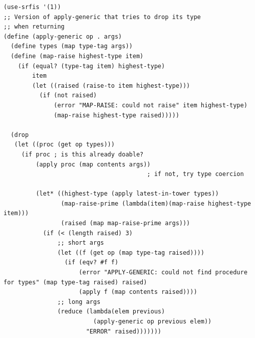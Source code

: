 \documentclass[final,fleqn,titlepage,twoside]{article}
\begin{document}
\begin{verbatim}
(use-srfis '(1))
;; Version of apply-generic that tries to drop its type
;; when returning
(define (apply-generic op . args)
  (define types (map type-tag args))
  (define (map-raise highest-type item)
    (if (equal? (type-tag item) highest-type)
        item
        (let ((raised (raise-to item highest-type)))
          (if (not raised)
              (error "MAP-RAISE: could not raise" item highest-type)
              (map-raise highest-type raised)))))
  
  (drop
   (let ((proc (get op types)))
     (if proc ; is this already doable?
         (apply proc (map contents args))
                                        ; if not, try type coercion
         
         (let* ((highest-type (apply latest-in-tower types))
                (map-raise-prime (lambda(item)(map-raise highest-type item)))
                (raised (map map-raise-prime args)))
           (if (< (length raised) 3)
               ;; short args
               (let ((f (get op (map type-tag raised))))
                 (if (eqv? #f f)
                     (error "APPLY-GENERIC: could not find procedure for types" (map type-tag raised) raised)
                     (apply f (map contents raised))))
               ;; long args
               (reduce (lambda(elem previous)
                         (apply-generic op previous elem))
                       "ERROR" raised)))))))
\end{verbatim}
\end{document}
